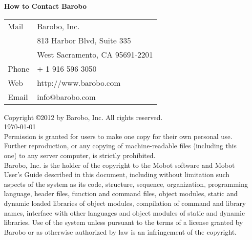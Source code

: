 \newpage
\noindent
{\large\bf How to Contact Barobo}\\
\vspace*{-6pt}

\begin{tabular} {ll}
Mail & Barobo, Inc. \\
      &813 Harbor Blvd, Suite 335\\
      &West Sacramento, CA 95691-2201\\
Phone & + 1 916 596-3050\\
Web &http://www.barobo.com\\
Email &info@barobo.com 
\end{tabular}

\vspace{12pt}
\noindent
Copyright \copyright 2012 by Barobo, Inc.
All rights reserved. \\
\today\\

\noindent
Permission is granted for users to make
one copy for their own personal use. Further reproduction,
or any copying of machine-readable files (including this one)
to any server computer, is strictly prohibited.\\


\noindent
Barobo, Inc. 
is the holder of the copyright to the Mobot software
and Mobot User's Guide
described in this document, including without limitation
such aspects of the system as its code, structure,
sequence, organization, 
programming language, 
header files, 
function and command files,
object modules,
static and dynamic loaded libraries 
of object modules,
compilation of command and library names, 
interface with other languages and object modules
of static and dynamic libraries.
Use of the system unless pursuant to the terms
of a license granted by Barobo or as
otherwise authorized by law is an infringement
of the copyright.\\


